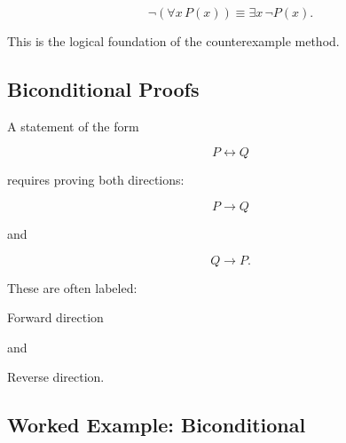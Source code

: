 \[ \neg(\forall x\,P(x))\equiv\exists x\,\neg P(x). \]

This is the logical foundation of the counterexample method.

\subsection{Biconditional Proofs}
\label{subsec:biconditional-proofs}

A statement of the form

\[ P\leftrightarrow Q \]

requires proving both directions:

\[ P\to Q \]

and

\[ Q\to P. \]

These are often labeled:

\begin{center}
Forward direction
\end{center}

and

\begin{center}
Reverse direction.
\end{center}

\subsection{Worked Example: Biconditional}
\label{subsec:worked-biconditional}

